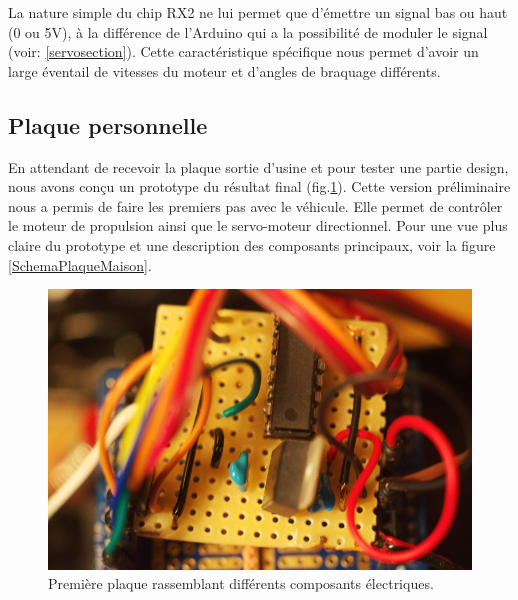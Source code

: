 \documentclass[a4paper,11pt]{report}
\begin{document}
{La nature simple du chip RX2 ne lui permet que d'émettre un signal bas ou haut
(0 ou 5V), à la différence de l'Arduino qui a la possibilité de moduler le
signal (voir: \ref{servosection}). Cette caractéristique spécifique nous permet
d'avoir un large éventail de vitesses du moteur et d'angles de braquage
différents. 



\subsection{Plaque personnelle}
En attendant de recevoir la plaque sortie d'usine et pour tester une partie
design, nous avons conçu un prototype du résultat final
(fig.\ref{PPFigure}). Cette version préliminaire nous a permis de faire les
premiers
pas avec le véhicule. Elle permet de contrôler le moteur de propulsion ainsi
que le servo-moteur directionnel.
Pour une vue plus claire du prototype et une description des composants
principaux, voir la figure \ref{SchemaPlaqueMaison}. 

\begin{figure}[h]
\centering
\includegraphics[width=1.0\textwidth]{figures/DSC_1116res}
    \caption[Prototype du PCB]{\label{PPFigure}Première plaque rassemblant différents composants électriques. 
    }
\end{figure}
 
}
\end{document}
